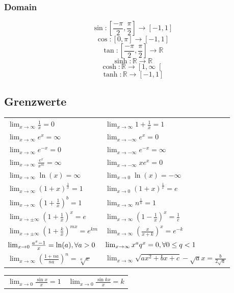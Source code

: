 \documentclass[7pt,landscape, margin = 0.1mm]{article}
\def\limxo{\lim_{x\to 0}}
\def\limxi{\lim_{x\to\infty}}
\def\limxn{\lim_{x\to-\infty}}
\begin{document}
\begin{multicols}{4}
\subsubsection{Domain}
$$\sin: \left[\frac{-\pi}{2},\frac{\pi}{2} \right] \longrightarrow \left[-1,1\right]$$
 $$\cos: \left[0,\pi \right] \longrightarrow \left[-1,1\right]$$
$$\tan: \left[\frac{-\pi}{2},\frac{\pi}{2}\right] \longrightarrow \mathbb{R}$$
$$\sinh: \mathbb{R} \longrightarrow\mathbb{R} $$
 $$\cosh: \mathbb{R}\longrightarrow \left[1,\infty\right[$$
 $$\tanh: \mathbb{R}\longrightarrow \left[-1,1\right]$$


\subsection{Grenzwerte}
\begin{center}
  \begin{tabularx}{\linewidth}{XX}
    \toprule
    $\limxi \frac{1}{x} = 0$ & $\limxi 1 + \frac{1}{x} = 1$ \\
    $\limxi e^x = \infty$ & $\limxn e^x = 0$ \\
    $\limxi e^{-x} = 0$ & $\limxn e^{-x} = \infty$ \\
    $\limxi \frac{e^x}{x^m} = \infty$ & $\limxn xe^x = 0$ \\
    $\limxi \ln(x) = \infty$ & $\limxo \ln(x) = -\infty$ \\
    $\limxi (1+x)^{\frac{1}{x}} = 1$ & $\limxo (1+x)^{\frac{1}{x}} = e$ \\
    $\limxi (1+\frac{1}{x})^b = 1$ & $\limxi n^{\frac{1}{n}} = 1$ \\
    $\lim_{x\to\pm\infty} (1 + \frac{1}{x})^x = e$ & $\limxi (1-\frac{1}{x})^x = \frac{1}{e}$ \\
    $\lim_{x\to\pm\infty} (1 + \frac{k}{x})^{mx} = e^{km}$ & $\limxi (\frac{x}{x+k})^x = e^{-k}$ \\
    $\limxo \frac{a^x -1}{x} = \ln(a), \newline \forall a > 0$ &
    $\limxi x^a q^x = 0, \newline \forall 0 \le q < 1$ \\
    $\lim_{x \to \infty} \left(\frac{1+ na}{na} \right)^n = \sqrt[a]{e}$ & $\lim_{x \to \infty} \sqrt{ax^2 + bx+c}- \sqrt{a}x = \frac{b}{2 \sqrt{a}}$\\
  \end{tabularx}
  \begin{tabularx}{\linewidth}{XX}
    $\limxo \frac{\sin x}{x} = 1$ & $\limxo \frac{\sin kx}{x} = k$\\

\end{tabularx}
\end{center}
\end{multicols}
\end{document}
